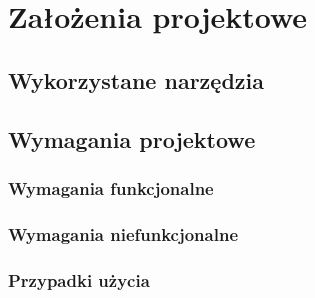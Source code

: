 \chapter{Założenia projektowe}
\section{Wykorzystane narzędzia}
\section{Wymagania projektowe}
\subsection{Wymagania funkcjonalne}
\subsection{Wymagania niefunkcjonalne}
\subsection{Przypadki użycia}